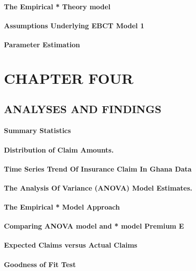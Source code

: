 \documentclass[10pt]{report}
\begin{document}
\begin{flushleft}
		\subsubsection{The Empirical * Theory model}
		\subsubsection{Assumptions Underlying EBCT Model 1}
		\subsubsection{Parameter Estimation}
		\chapter{CHAPTER  FOUR}
		\section{ANALYSES AND FINDINGS}
		\subsubsection{Summary Statistics}
		\subsubsection{Distribution of Claim Amounts.}
		\subsubsection{Time Series Trend Of Insurance  Claim In  Ghana Data}
		\subsubsection{The Analysis Of Variance (ANOVA) Model Estimates.}
		\subsubsection{The Empirical * Model Approach}
		\subsubsection{Comparing ANOVA model and * model Premium E}
		\subsubsection{Expected Claims versus Actual Claims}
		\subsubsection{Goodness of Fit Test}

\end{flushleft}
\end{document}
